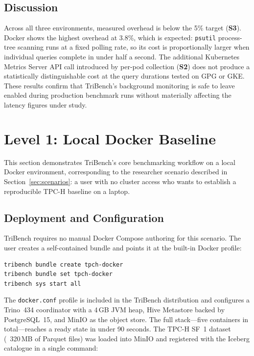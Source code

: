 \documentclass{l4proj}
\begin{document}
\subsection{Discussion}
\label{sec:eval_overhead_discussion}

Across all three environments, measured overhead is below the 5\% target (\textbf{S3}). Docker shows the highest overhead at 3.8\%, which is expected: \texttt{psutil} process-tree scanning runs at a fixed polling rate, so its cost is proportionally larger when individual queries complete in under half a second. The additional Kubernetes Metrics Server API call introduced by per-pod collection (\textbf{S2}) does not produce a statistically distinguishable cost at the query durations tested on GPG or GKE. These results confirm that TriBench's background monitoring is safe to leave enabled during production benchmark runs without materially affecting the latency figures under study.

\section{Level 1: Local Docker Baseline}
\label{sec:eval_l1}

This section demonstrates TriBench's core benchmarking workflow on a local Docker environment, corresponding to the researcher scenario described in Section~\ref{sec:scenarios}: a user with no cluster access who wants to establish a reproducible TPC-H baseline on a laptop.

\subsection{Deployment and Configuration}
\label{sec:eval_l1_deploy}

TriBench requires no manual Docker Compose authoring for this scenario. The user creates a self-contained bundle and points it at the built-in Docker profile:

\begin{verbatim}
tribench bundle create tpch-docker
tribench bundle set tpch-docker
tribench sys start all
\end{verbatim}

\noindent The \texttt{docker.conf} profile is included in the TriBench distribution and configures a Trino~434 coordinator with a 4\,GB JVM heap, Hive Metastore backed by PostgreSQL~15, and MinIO as the object store. The full stack---five containers in total---reaches a ready state in under 90 seconds. The TPC-H SF~1 dataset (~320\,MB of Parquet files) was loaded into MinIO and registered with the Iceberg catalogue in a single command:
\end{document}
